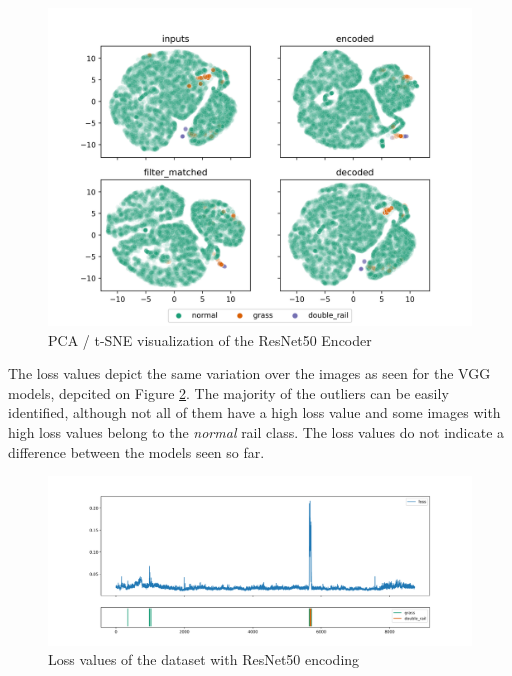 \begin{figure}[!ht]
    \centering
    \includegraphics[width=\textwidth,trim={0 0 0 1cm},clip]{./results/resnet50_vgg19/20230514_213740_feature_vectors_1.png}
    \caption{PCA / t-SNE visualization of the ResNet50 Encoder}
    \label{fig:resnet50_pca}
\end{figure}

The loss values depict the same variation over the images as seen for the VGG models,
depcited on Figure \ref{fig:resnet50_loss}.
The majority of the outliers can be easily identified, although not all of them have a high loss value
and some images with high loss values belong to the \emph{normal} rail class.
The loss values do not indicate a difference between the models seen so far.

\begin{figure}[!ht]
    \centering
    \includegraphics[width=\textwidth,trim={0 1cm 0 1cm},clip]{./results/resnet50_vgg19/20230514_213740_feature_vectors_loss.png}
    \caption{Loss values of the dataset with ResNet50 encoding}
    \label{fig:resnet50_loss}
\end{figure}

